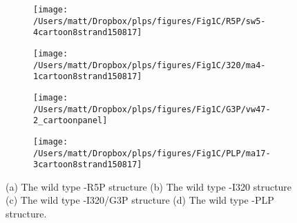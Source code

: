 \begin{figure}[!htbp]
\centering
\begin{subfigure}{.225\textwidth}
  \centering
  \texttt{[image: /Users/matt/Dropbox/plps/figures/Fig1C/R5P/sw5-4cartoon8strand150817]}
  \caption{}
\end{subfigure}
\begin{subfigure}{.225\textwidth}
  \centering
  \texttt{[image: /Users/matt/Dropbox/plps/figures/Fig1C/320/ma4-1cartoon8strand150817]}
  \caption{\label{fig:I320_panel}}
\end{subfigure}
\begin{subfigure}{.225\textwidth}
  \centering
  \texttt{[image: /Users/matt/Dropbox/plps/figures/Fig1C/G3P/vw47-2\_cartoonpanel]}
  \caption{\label{fig:G3P_panel}}
\end{subfigure}
\begin{subfigure}{.225\textwidth}
  \centering
  \texttt{[image: /Users/matt/Dropbox/plps/figures/Fig1C/PLP/ma17-3cartoon8strand150817]}
  \caption{\label{fig:PLP_panel}}
\end{subfigure}
\caption[Wild Type \atpdx~ structures in sequence]{(a) The wild type \atpdx -R5P structure (b) The wild type \atpdx -I320 structure (c) The wild type \atpdx -I320/G3P structure (d) The wild type \atpdx -PLP structure.\label{fig:cartoon_panel}}
\end{figure}  





